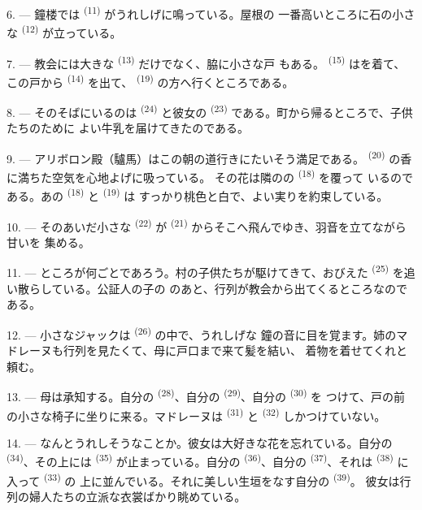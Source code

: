6. --- 鐘楼では \textsuperscript{(11)} がうれしげに鳴っている。屋根の
一番高いところに石の小さな \textsuperscript{(12)} が立っている。

7. --- 教会には大きな \textsuperscript{(13)} だけでなく、脇に小さな戸
もある。 \textsuperscript{(15)} はを着て、この戸から
 \textsuperscript{(14)} を出て、 \textsuperscript{(19)}
の方へ行くところである。

8. --- そのそばにいるのは \textsuperscript{(24)} と彼女の
 \textsuperscript{(23)} である。町から帰るところで、子供たちのために
よい牛乳を届けてきたのである。

\VUsaut{4.0mm}
\VUsaut{3.4mm}

9. --- アリボロン殿（驢馬）はこの朝の道行きにたいそう満足である。
 \textsuperscript{(20)} の香に満ちた空気を心地よげに吸っている。
その花は隣のの \textsuperscript{(18)} を覆って
いるのである。あの
 \textsuperscript{(18)} と \textsuperscript{(19)} は
すっかり桃色と白で、よい実りを約束している。

10. --- そのあいだ小さな \textsuperscript{(22)} が
\textsuperscript{(21)} からそこへ飛んでゆき、羽音を立てながら甘いを
集める。

11. --- ところが何ごとであろう。村の子供たちが駆けてきて、おびえた
 \textsuperscript{(25)} を追い散らしている。公証人の子の
のあと、行列が教会から出てくるところなのである。

12. --- 小さなジャックは \textsuperscript{(26)} の中で、うれしげな
鐘の音に目を覚ます。姉のマドレーヌも行列を見たくて、母に戸口まで来て髪を結い、
着物を着せてくれと頼む。

13. --- 母は承知する。自分の \textsuperscript{(28)}、自分の
 \textsuperscript{(29)}、自分の \textsuperscript{(30)} を
つけて、戸の前の小さな椅子に坐りに来る。マドレーヌは
\textsuperscript{(31)} と \textsuperscript{(32)} しかつけていない。

14. --- なんとうれしそうなことか。彼女は大好きな花を忘れている。自分の
 \textsuperscript{(34)}、その上には
\textsuperscript{(35)} が止まっている。自分の
\textsuperscript{(36)}、自分の \textsuperscript{(37)}、それは
 \textsuperscript{(38)} に入って \textsuperscript{(33)} の
上に並んでいる。それに美しい生垣をなす自分の \textsuperscript{(39)}。
彼女は行列の婦人たちの立派な衣裳ばかり眺めている。

